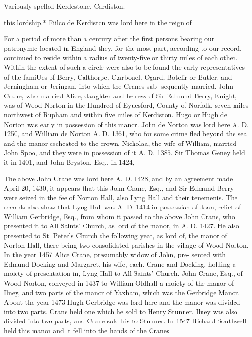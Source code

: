 \documentclass{book}
\begin{document}
Variously spelled Kerdestone, Cardiston. 




this lordship.* Fiilco de Kerdiston was lord here in the reign of 

For a period of more than a century after the first persons 
bearing our patronymic located in England they, for the most 
part, according to our record, continued to reside within a radius 
of twenty-five or thirty miles of each other. Within the extent 
of such a circle were also to be found the early representatives of 
the famiUes of Berry, Calthorpe, C.arbonel, Ogard, Botelir or 
Butler, and Jerningham or Jeringan, into which the Cranes sub- 
sequently married. John Crane, who married Alice, daughter 
and heiress of Sir Edmund Berry, Knight, was of Wood-Norton 
in the Hundred of Eyuesford, County of Norfolk, seven miles 
northwest of Rupham and within five miles of Kerdiston. Hugo 
or Hugh de Norton was early in possession of this manor. John 
de Norton was lord here A. D. 1250, and William de Norton A. 
D. 1361, who for some crime fled beyond the sea and the manor 
escheated to the crown. Nicholaa, the wife of William, married 
John Spoo, and they were in possession of it A. D. 1386. Sir 
Thomas Geney held it in 1401, and John Bryston, Esq., in 1424, 

The above John Crane was lord here A. D. 1428, and by an 
agreement made April 20, 1430, it appears that this John Crane, 
Esq., and Sir Edmund Berry were seized in the fee of Norton 
Hall, also Lyng Hall and their tenements. The records also 
show that Lyng Hall was A. D. 1414 in possession of Joan, relict 
of William Gerbridge, Esq., from whom it passed to the above 
John Crane, who presented it to All Saints' Church, as lord of the 
manor, in A. D. 1427. He also presented to St. Peter's Church 
the following year, as lord of, the manor of Norton Hall, there 
being two consolidated parishes in the village of Wood-Norton. 
In the year 1457 Alice Crane, presumably widow of John, pre- 
sented with Edmund Docking and Margaret, his wife, each. 
Crane and Docking, holding a moiety of presentation in, Lyng 
Hall to All Saints' Church. John Crane, Esq., of Wood-Norton, 
conveyed in 1437 to William Oldhall a moiety of the manor of 
Ilney, and two parts of the manor of Yaxham, which was the 
Gerbridge Manor. About the year 1473 Hugh Gerbridge was 
lord here and the manor was divided into two parts. Crane held 
one which he sold to Henry Stunner. Ilney was also divided 
into two parts, and Crane sold his to Stunner. In 1547 Richard 
Southwell held this manor and it fell into the hands of the Cranes 
\end{document}
